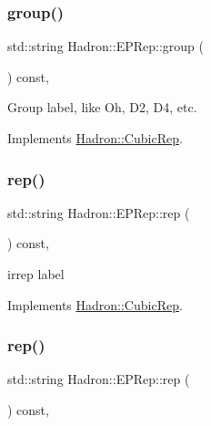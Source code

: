 \subsubsection{\texorpdfstring{group()}{group()}\hspace{0.1cm}{\footnotesize\ttfamily [3/3]}}
{\footnotesize\ttfamily std\+::string Hadron\+::\+E\+P\+Rep\+::group (\begin{DoxyParamCaption}{ }\end{DoxyParamCaption}) const\hspace{0.3cm}{\ttfamily [inline]}, {\ttfamily [virtual]}}

Group label, like Oh, D2, D4, etc. 

Implements \mbox{\hyperlink{structHadron_1_1CubicRep_a0748f11ec87f387062c8e8981339a29c}{Hadron\+::\+Cubic\+Rep}}.

\mbox{\label{structHadron_1_1EPRep_aa5bf2023752cfb939ced1f054cfd588f}} 
\subsubsection{\texorpdfstring{rep()}{rep()}\hspace{0.1cm}{\footnotesize\ttfamily [1/3]}}
{\footnotesize\ttfamily std\+::string Hadron\+::\+E\+P\+Rep\+::rep (\begin{DoxyParamCaption}{ }\end{DoxyParamCaption}) const\hspace{0.3cm}{\ttfamily [inline]}, {\ttfamily [virtual]}}

irrep label 

Implements \mbox{\hyperlink{structHadron_1_1CubicRep_ac3eb63608803d44c68681f158e14eb1b}{Hadron\+::\+Cubic\+Rep}}.

\mbox{\label{structHadron_1_1EPRep_aa5bf2023752cfb939ced1f054cfd588f}} 
\subsubsection{\texorpdfstring{rep()}{rep()}\hspace{0.1cm}{\footnotesize\ttfamily [2/3]}}
{\footnotesize\ttfamily std\+::string Hadron\+::\+E\+P\+Rep\+::rep (\begin{DoxyParamCaption}{ }\end{DoxyParamCaption}) const\hspace{0.3cm}{\ttfamily [inline]}, {\ttfamily [virtual]}}

